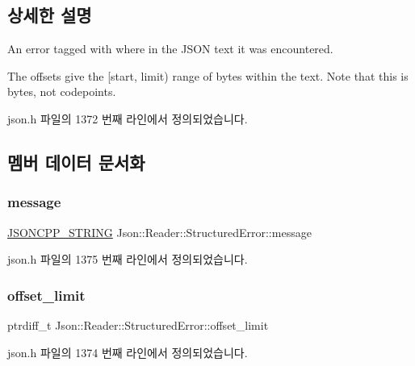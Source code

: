 \subsection{상세한 설명}
An error tagged with where in the J\+S\+ON text it was encountered. 

The offsets give the \mbox{[}start, limit) range of bytes within the text. Note that this is bytes, not codepoints. 

json.\+h 파일의 1372 번째 라인에서 정의되었습니다.



\subsection{멤버 데이터 문서화}
\mbox{\label{struct_json_1_1_reader_1_1_structured_error_a2d2dc387aefe406a71de3daa263a38f4}} 
\subsubsection{\texorpdfstring{message}{message}}
{\footnotesize\ttfamily \hyperlink{json_8h_a1e723f95759de062585bc4a8fd3fa4be}{J\+S\+O\+N\+C\+P\+P\+\_\+\+S\+T\+R\+I\+NG} Json\+::\+Reader\+::\+Structured\+Error\+::message}



json.\+h 파일의 1375 번째 라인에서 정의되었습니다.

\mbox{\label{struct_json_1_1_reader_1_1_structured_error_ad76ac01aeb0ada7e882c2df5daa54c6e}} 
\subsubsection{\texorpdfstring{offset\+\_\+limit}{offset\_limit}}
{\footnotesize\ttfamily ptrdiff\+\_\+t Json\+::\+Reader\+::\+Structured\+Error\+::offset\+\_\+limit}



json.\+h 파일의 1374 번째 라인에서 정의되었습니다.

